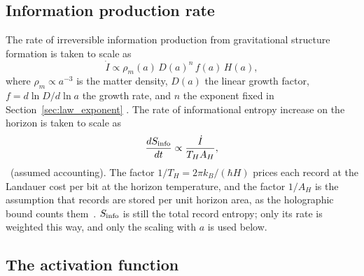 \subsection{Information production rate}\label{sec:law_rate}
The rate of irreversible information production from gravitational structure formation is taken to scale as
\begin{equation}
\dot I\propto\rho_m(a)\,D(a)^n\,f(a)\,H(a), \label{eq:rate}
\end{equation}
where $\rho_m\propto a^{-3}$ is the matter density, $D(a)$ the linear growth factor, $f=d\ln D/d\ln a$ the growth rate, and $n$ the exponent fixed in
Section~\ref{sec:law_exponent} \conjecture. The rate of informational entropy increase on the horizon is taken to scale as
\begin{equation}
\frac{dS_{\rm info}}{dt}\propto\frac{\dot I}{T_HA_H}, \label{eq:Sdot}
\end{equation}
\conjecture\ (assumed accounting). The factor $1/T_H=2\pi k_B/(\hbar H)$ prices each record at the Landauer cost per bit at the horizon temperature, and
the factor $1/A_H$ is the assumption that records are stored per unit horizon area, as the holographic bound counts them~\cite{tHooft1993,Susskind1995,Bousso2002}.
$S_{\rm info}$ is still the total record entropy; only its rate is weighted this way, and only the scaling with $a$ is used below.

\subsection{The activation function}\label{sec:law_activation}

